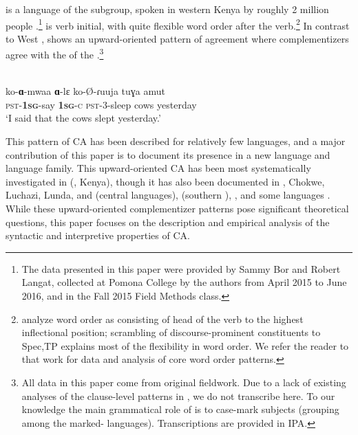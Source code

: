 \documentclass[output=paper
,newtxmath
,modfonts
,nonflat]{langsci/langscibook}
\begin{document}
 is a  language of the  subgroup, spoken in western Kenya by roughly 2 million people \autocite{Lewis:2016}.\footnote{The data presented in this paper were provided by Sammy Bor and Robert Langat, collected at Pomona College by the authors from April 2015 to June 2016, and in the Fall 2015 Field Methods class.}  is verb initial, with quite flexible word order after the verb.\footnote{\citet{BossiDiercks:2018:KipsigisV1} analyze  word order as consisting of head  of the verb to the highest inflectional position;  scrambling of discourse-prominent constituents  to Spec,TP explains most of the flexibility in word order. We refer the reader to that work for data and analysis of  core word order patterns.} In contrast to West ,  shows an upward-oriented pattern of agreement where complementizers agree with the  of the .\footnote{All  data in this paper come from original fieldwork. Due to a lack of existing analyses of the clause-level  patterns in , we do not transcribe  here. To our knowledge the main grammatical role of  is to case-mark  subjects (grouping  among the marked-  languages). Transcriptions are provided in IPA.} 

\ea \label{ex:Diercks,Rao:2}
 \\
\gll	ko-\textbf{ɑ}-mwaa \textbf{ɑ}-lɛ ko-\O-ɾuuja tuɣa amut \\
\textsc{pst}-\textbf{1\textsc{sg}}-say \textbf{1\textsc{sg}}-\textsc{c} \textsc{pst}-3-sleep cows yesterday \\
\glt `I said that the cows slept yesterday.'
\z

\noindent This pattern of CA has been described for relatively few languages, and a major contribution of this paper is to document its presence in a new language and language family. This upward-oriented CA has been most systematically investigated in  (, Kenya), though it has also been documented in , Chokwe, Luchazi, Lunda, and  (central  languages),  (southern ), , and some  languages \citep{Baker:2008b,Diercks:2013,Kawasha:2007,Idiatov:2010,Torrence:2016,LetsholoSafir:2017}. While these upward-oriented complementizer patterns pose significant theoretical questions, this paper focuses on the  description and empirical analysis of the syntactic and interpretive properties of  CA. 
\end{document}
